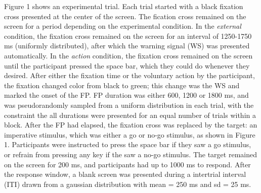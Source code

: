 \documentclass{article}
\begin{document}
Figure 1 shows an experimental trial. Each trial started with a black fixation cross presented at the center of the screen. The fication cross remained on the screen for a period depending on the experimental condition. In the \textit{external} condition, the fixation cross remained on the screen for an interval of 1250-1750 ms (uniformly distributed), after which the warning signal (WS) was presented automatically. In the \textit{action} condition, the fixation cross remained on the screen until the participant pressed the space bar, which they could do whenever they desired. After either the fixation time or the voluntary action by the participant, the fixation changed color from black to green; this change was the WS and marked the onset of the FP. FP duration was either 600, 1200 or 1800 ms, and was pseudorandomly sampled from a uniform distribution in each trial, with the constraint the all durations were presented for an equal number of trials within a block. After the FP had elapsed, the fixation cross was replaced by the target: an imperative stimulus, which was either a go or no-go stimulus, as shown in Figure 1. Participants were instructed to press the space bar if they saw a go stimulus, or refrain from pressing any key if the saw a no-go stimulus. The target remained on the screen for 200 ms, and participants had up to 1000 ms to respond. After the response window, a blank screen was presented during a intertrial interval (ITI) drawn from a gaussian distribution with mean = 250 ms and sd = 25 ms. %

\printbibliography
%
\end{document}
